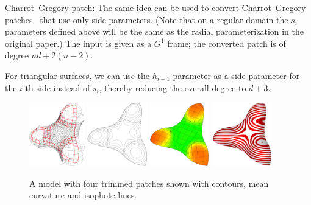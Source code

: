 \documentclass{article}
\begin{document}
\vspace{10pt}
\noindent\underline{Charrot--Gregory patch:}\vspace{0.2em}\newline
The same idea can be used to convert Charrot--Gregory patches~\cite{charrot} that use
only side parameters. (Note that on a regular domain the $s_i$ parameters defined above
will be the same as the radial parameterization in the original paper.)
The input is given as a $G^1$ frame; the converted patch is of degree $nd+2(n-2)$.

For triangular surfaces, we can use the $h_{i-1}$ parameter as a side parameter for the $i$-th
side instead of $s_i$, thereby reducing the overall degree to $d+3$.
\begin{figure}[h!]
  \includegraphics[width = 0.2139\textwidth]{images/trebol3-cnet.png}
  \hfill
  \includegraphics[width = 0.23\textwidth]{images/trebol3-contour.jpg}
  \hfill
  \includegraphics[width = 0.23\textwidth]{images/trebol3-mean-iso.jpg}
  \hfill
  \includegraphics[width = 0.23\textwidth]{images/trebol3-zebra.jpg}
  \caption{A model with four trimmed patches shown with contours, mean curvature and
    isophote lines.}
\end{figure}
\end{document}
